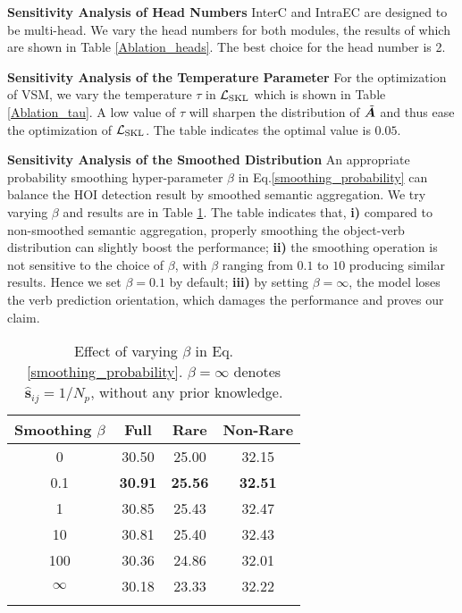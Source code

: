 \documentclass[letterpaper]{article} %
\begin{document}
\textbf{Sensitivity Analysis of Head Numbers} InterC and IntraEC are designed to be multi-head. We vary the head numbers for both modules, the results of which are shown in Table \ref{Ablation_heads}. The best choice for the head number is 2.

\textbf{Sensitivity Analysis of the Temperature Parameter} For the optimization of VSM, we vary the temperature $\tau$ in $\mathcal{L}_{\rm SKL}$ which is shown in Table \ref{Ablation_tau}. A low value of $\tau$ will sharpen the distribution of $\Tilde{\bm{A}}$ and thus ease the optimization of $\mathcal{L}_{\rm SKL}$. The table indicates the optimal value is $0.05$.

\textbf{Sensitivity Analysis of the Smoothed Distribution} An appropriate probability smoothing hyper-parameter $\beta$ in Eq.\ref{smoothing_probability} can balance the HOI detection result by smoothed semantic aggregation. We try varying $\beta$ and results are in Table \ref{smoothing_beta}. The table indicates that, \textbf{i)} compared to non-smoothed semantic aggregation, properly smoothing the object-verb distribution can slightly boost the performance; \textbf{ii)} the smoothing operation is not sensitive to the choice of $\beta$, with $\beta$ ranging from $0.1$ to $10$ producing similar results. Hence we set $\beta = 0.1$ by default; \textbf{iii)} by setting $\beta = \infty$, the model loses the verb prediction orientation, which damages the performance and proves our claim.


\begin{table}[t]
  \small
  \setlength{\tabcolsep}{5pt}
  \centering
    \begin{tabular}{c|ccc}
    \Xhline{1.0pt}
    \textbf{Smoothing $\beta$} & \textbf{Full} & \textbf{Rare} & {\footnotesize \textbf{Non-Rare}} \\
    \hline
    \hline
    0  & 30.50  & 25.00  & 32.15  \\
    0.1  & \textbf{30.91} & \textbf{25.56} & \textbf{32.51} \\
    1  & 30.85  & 25.43  & 32.47  \\
    10  & 30.81  & 25.40  & 32.43  \\
    100  & 30.36  & 24.86  & 32.01  \\
    $\infty$ & 30.18 & 23.33  & 32.22 \\
    \Xhline{1.0pt}
    \end{tabular}%
    \caption{Effect of varying $\beta$ in Eq.\ref{smoothing_probability}. $\beta = \infty$ denotes $\hat{\bm{s}}_{ij} = 1/N_p$, without any prior knowledge.}
  \label{smoothing_beta}%
\end{table}%
\end{document}

